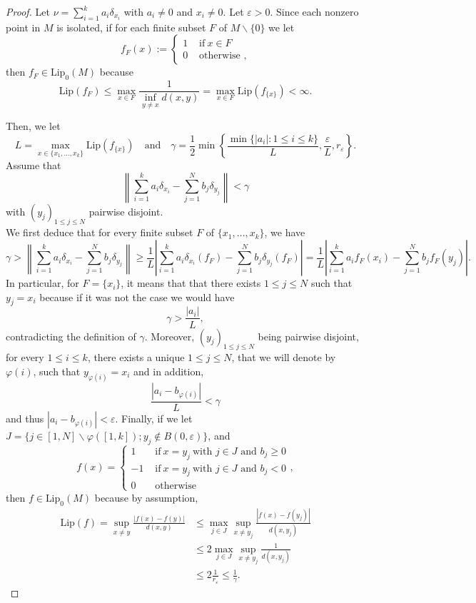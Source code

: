 \documentclass[12pt,english]{amsart}
\numberwithin{equation}{section}
\theoremstyle{plain}
\theoremstyle{definition}
\def\lip{ \text{Lip}}
\begin{document}
\begin{proof}
Let $\nu=\sum_{i=1}^k a_i \delta_{x_i}$ with $a_i\ne 0$ and $x_i\ne 0$. Let $\varepsilon>0$. Since each nonzero point in $M$ is isolated, if for each finite subset $F$ of $M\backslash\{0\}$ we let 
\[f_{F}(x):=\begin{cases}
      1 &\text{ if}\ x\in F \\
  0 &\text{ otherwise },
\end{cases}\]
then $f_F\in \text{Lip}_0(M)$ because 
\[\lip(f_{F})\le \max_{x\in F} \frac{1}{\inf_{y\ne x} d(x,y)}=\max_{x\in F}\lip(f_{\{x\}})<\infty.\]

Then, we let
\[L=\max_{x\in \{x_1,\dots,x_k\}}\lip(f_{\{x\}})\quad  \text{and} \quad  \gamma=\frac{1}{2}\min\left\{\frac{\min\{|a_i|:1\le i\le k\}}{L},\frac{\varepsilon}{L},r_{\varepsilon} \right\}.\] 
Assume that
\[\left\|\sum_{i=1}^k a_i \delta_{x_i}-\sum_{j=1}^N b_j \delta_{y_j}\right\|<\gamma\]
with $(y_j)_{1\le j\le N}$ pairwise disjoint.\\
We first deduce that for every finite subset $F$ of $\{x_1,\dots,x_k\}$, we have
\[
\gamma>\left\|\sum_{i=1}^k a_i \delta_{x_i}-\sum_{j=1}^N b_j \delta_{y_j}\right\|\ge \frac{1}{L} \left\vert\sum_{i=1}^k a_i \delta_{x_i}(f_F)-\sum_{j=1}^N b_j \delta_{y_j}(f_F)\right\vert= \frac{1}{L} \left\vert\sum_{i=1}^k a_i f_F(x_i)-\sum_{j=1}^N b_j f_F(y_j)\right\vert.
\]
In particular, for $F=\{x_i\}$, it means that that there exists $1\le j\le N$ such that $y_j=x_i$ because if it was not the case we would have \[\gamma>\frac{|a_i|}{L},\]
contradicting the definition of $\gamma$. Moreover, $(y_j)_{1\le j\le N}$ being pairwise disjoint, for every $1\le i\le k$, there exists a unique $1\le j\le N$, that we will denote by $\varphi(i)$, such that $y_{\varphi(i)}=x_i$ and in addition,  
\[\frac{|a_i-b_{\varphi(i)}|}{L}<\gamma\]
and thus $|a_i-b_{\varphi(i)}|<\varepsilon$. Finally, if we let $J=\{j\in [1,N]\backslash \varphi([1,k]); y_j\notin  B(0,\varepsilon)\}$, and
\[f(x)=\begin{cases}
      1 &\text{ if}\ x=y_j \ \text{with $j\in J$ and $b_j\ge 0$} \\
      -1 &\text{ if}\ x=y_j \ \text{with $j\in J$ and $b_j< 0$} \\      
  0 &\text{ otherwise }
\end{cases},\]
then $f\in \text{Lip}_0(M)$ because by assumption,
\begin{align*}
\lip(f)=\sup_{x\ne y}\frac{|f(x)-f(y)|}{d(x,y)}
&\le \max_{j\in J}\sup_{x\ne y_j}\frac{|f(x)-f(y_j)|}{d(x,y_j)}\\
&\le 2 \max_{j\in J}\sup_{x\ne y_j}\frac{1}{d(x,y_j)}\\
&\le 2 \frac{1}{r_{\varepsilon}}\le \frac{1}{\gamma}.
\end{align*}


\end{proof}
\end{document}
